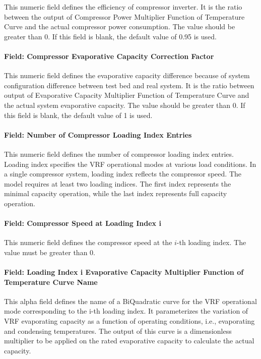 This numeric field defines the efficiency of compressor inverter. It is the ratio between the output of Compressor Power Multiplier Function of Temperature Curve and the actual compressor power consumption. The value should be greater than 0. If this field is blank, the default value of 0.95 is used.

\paragraph{Field: Compressor Evaporative Capacity Correction Factor}

This numeric field defines the evaporative capacity difference because of system configuration difference between test bed and real system. It is the ratio between output of Evaporative Capacity Multiplier Function of Temperature Curve and the actual system evaporative capacity. The value should be greater than 0. If this field is blank, the default value of 1 is used.

\paragraph{Field: Number of Compressor Loading Index Entries}

This numeric field defines the number of compressor loading index entries. Loading index specifies the VRF operational modes at various load conditions. In a single compressor system, loading index reflects the compressor speed. The model requires at least two loading indices. The first index represents the minimal capacity operation, while the last index represents full capacity operation.

\paragraph{Field: Compressor Speed at Loading Index i}

This numeric field defines the compressor speed at the $i$-th loading index. The value must be greater than 0.

\paragraph{Field: Loading Index i Evaporative Capacity Multiplier Function of Temperature Curve Name}

This alpha field defines the name of a BiQuadratic curve for the VRF operational mode corresponding to the i-th loading index. It parameterizes the variation of VRF evaporating capacity as a function of operating conditions, i.e., evaporating and condensing temperatures. The output of this curve is a dimensionless multiplier to be applied on the rated evaporative capacity to calculate the actual capacity.

